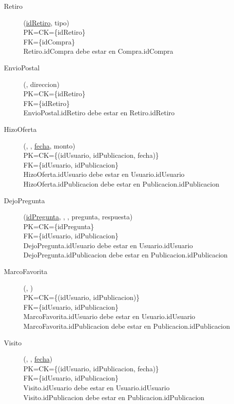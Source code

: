 \begin{description}
 \item[Retiro](\underline{idRetiro}, tipo)\\
PK=CK=\{idRetiro\}\\
FK=\{idCompra\}\\
Retiro.idCompra debe estar en Compra.idCompra

 \item[EnvioPostal](\underline{}, direccion)\\
PK=CK=\{idRetiro\}\\
FK=\{idRetiro\}\\
EnvioPostal.idRetiro debe estar en Retiro.idRetiro

  \item[HizoOferta](\underline{}, \underline{}, \underline{fecha}, monto)\\
PK=CK=\{(idUsuario, idPublicacion, fecha)\}\\
FK=\{idUsuario, idPublicacion\}\\
HizoOferta.idUsuario debe estar en Usuario.idUsuario\\
HizoOferta.idPublicacion debe estar en Publicacion.idPublicacion\\

  \item[DejoPregunta](\underline{idPregunta}, , , pregunta, respuesta)\\
PK=CK=\{idPregunta\}\\
FK=\{idUsuario, idPublicacion\}\\
DejoPregunta.idUsuario debe estar en Usuario.idUsuario\\
DejoPregunta.idPublicacion debe estar en Publicacion.idPublicacion\\

  \item[MarcoFavorita](\underline{}, \underline{})\\
PK=CK=\{(idUsuario, idPublicacion)\}\\
FK=\{idUsuario, idPublicacion\}\\
MarcoFavorita.idUsuario debe estar en Usuario.idUsuario\\
MarcoFavorita.idPublicacion debe estar en Publicacion.idPublicacion\\

  \item[Visito](\underline{}, \underline{}, \underline{fecha})\\
PK=CK=\{(idUsuario, idPublicacion, fecha)\}\\
FK=\{idUsuario, idPublicacion\}\\
Visito.idUsuario debe estar en Usuario.idUsuario\\
Visito.idPublicacion debe estar en Publicacion.idPublicacion\\

\end{description}

\newpage
